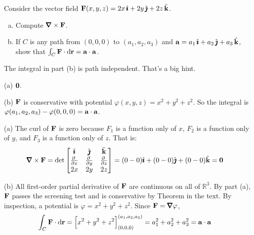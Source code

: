 \begin{question}[M317 2005D] %
Consider the vector field $\mathbf{F}(x, y, z) = 2x\,\hat{\pmb{\imath}} + 2y\,\hat{\pmb{\jmath}} + 2z\,\hat{\mathbf{k}}$.
\begin{enumerate}[(a)]
\item
Compute $\vnabla\times\vF$.
\item
If $C$ is any path from $(0, 0, 0)$ to $(a_1 , a_2 , a_3)$ and 
$\mathbf{a} = a_1\,\hat{\pmb{\imath}} + a_2\,\hat{\pmb{\jmath}} + a_3\,\hat{\mathbf{k}}$, show that
$\int_C \mathbf{F}\cdot \mathrm{d}\mathbf{r} = \mathbf{a}\cdot\mathbf{a}$.
\end{enumerate}
\end{question}

\begin{hint} 
The integral in part (b) is path independent. That's a big hint. 
\end{hint}

\begin{answer} 
(a) $\mathbf{0}$.

(b) $\mathbf{F}$ is conservative with potential $\varphi(x,y,z) = x^2 + y^2 +z^2$.
    So the integral is $\varphi(a_1,a_2,a_3) - \varphi(0,0,0) = \mathbf{a}\cdot\mathbf{a}$.
\end{answer}

\begin{solution} (a) 
The curl of $\mathbf{F}$ is zero because $F_1$ is a function only of $x$, $F_2$ is a function only of $y$, and $F_3$ is a function only of $z$. That is:
\begin{align*}
\vnabla\times\vF
&=\det\left[\begin{matrix}
\hi &\hj &\hk \\
\pdiff{}{x} & \pdiff{}{y} & 
                \pdiff{}{z} \\
2x &  2y & 2z
\end{matrix}
\right]=(0-0)\hi+(0-0)\hj+(0-0)\hk
=\vZero
\end{align*}

\noindent (b)
All first-order partial derivative of $\mathbf{F}$ are continuous on all of $\mathbb R^3$. By part (a), $\mathbf{F}$ passes the screening test and is conservative by 
Theorem  in the  text.
By inspection, a potential is $\varphi=x^2+y^2+z^2$.
Since $\vF=\vnabla\varphi$, 
\begin{align*}
\int_C \mathbf{F} \cdot \mathrm{d}\mathbf{r}
&=\Big[x^2+y^2+z^2\Big]^{(a_1,a_2,a_3)}_{(0,0,0)}
=a_1^2 + a_2^2 + a_3^2
=\mathbf{a}\cdot\mathbf{a}
\end{align*}

\end{solution}


